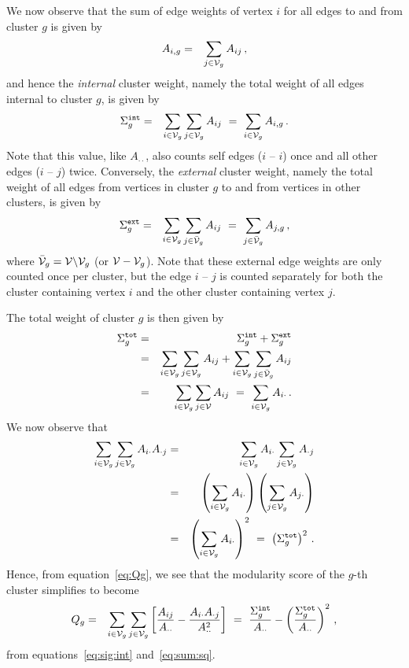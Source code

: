 \documentclass[a4paper]{article}
\begin{document}
We now observe that the sum of edge weights of vertex $i$ for all edges to and from cluster $g$
is given by
\begin{eqnarray}
  A_{i,g} & = & \sum_{j\in{\cal V}_g} A_{ij}\,,
\end{eqnarray}
and hence the {\em internal} cluster weight, namely the total weight of all edges internal to 
cluster $g$, is given by
\begin{eqnarray}
   \Sigma_g^{\tt int} & = & \sum_{i\in{\cal V}_g}\sum_{j\in{\cal V}_g} A_{ij}
   ~=~\sum_{i\in{\cal V}_g} A_{i,g}\,.
\label{eq:sig:int}
\end{eqnarray}
Note that this value, like $A_{\cdot\cdot}$, also counts self edges ($i$ -- $i$) once and all other edges 
($i$ -- $j$) twice.
Conversely, the {\em external} cluster weight, namely the total weight of all edges from vertices
in cluster $g$ to and from vertices in other clusters, is given by
\begin{eqnarray}
   \Sigma_g^{\tt ext} & = & \sum_{i\in{\cal V}_g}\sum_{j\in\bar{\cal V}_g}
   A_{ij} ~=~\sum_{j\in\bar{\cal V}_g} A_{j,g}\,,
\label{eq:sig:ext}
\end{eqnarray}
where $\bar{\cal V}_g={\cal V}\backslash{\cal V}_g$ (or ${\cal V}-{\cal V}_g$).
Note that these external edge weights are only counted once per cluster, but the
edge $i$ -- $j$ is counted separately for both the cluster containing vertex $i$
and the other cluster containing vertex $j$.

The total weight of cluster $g$ is then given by
\begin{eqnarray}
   \Sigma_g^{\tt tot} & = & \Sigma_g^{\tt int} + \Sigma_g^{\tt ext}
\nonumber\\&=&
   \sum_{i\in{\cal V}_g}\sum_{j\in{\cal V}_g} A_{ij} 
   + \sum_{i\in{\cal V}_g}\sum_{j\in\bar{\cal V}_g} A_{ij}
\nonumber\\&=&
   \sum_{i\in{\cal V}_g}\sum_{j\in{\cal V}} A_{ij}~=~\sum_{i\in{\cal V}_g}A_{i\cdot}\,.
\label{eq:sig:tot}
\end{eqnarray}
We now observe that
\begin{eqnarray}
    \sum_{i\in{\cal V}_g}\sum_{j\in{\cal V}_g} A_{i\cdot}A_{\cdot j}
    & = & \sum_{i\in{\cal V}_g}A_{i\cdot}\sum_{j\in{\cal V}_g} A_{\cdot j}
\nonumber\\&=&
    \left(\sum_{i\in{\cal V}_g}A_{i\cdot}\right)\left(\sum_{j\in{\cal V}_g} A_{j\cdot}\right)
\nonumber\\&=&
    \left(\sum_{i\in{\cal V}_g}A_{i\cdot}\right)^2 ~=~ \left(\Sigma_g^{\tt tot}\right)^2\,.
\label{eq:sum:sq}
\end{eqnarray}
Hence, from equation~\eqref{eq:Qg}, we see that the modularity score of the $g$-th cluster
simplifies to become
\begin{eqnarray}
   Q_g & = & \sum_{i\in{\cal V}_g}\sum_{j\in{\cal V}_g} \left[
  \frac{A_{ij}}{A_{\cdot\cdot}}-
  \frac{A_{i\cdot}A_{\cdot j}}{A_{\cdot\cdot}^2}
  \right]
~=~    \frac{\Sigma_g^{\tt int}}{A_{\cdot\cdot}}
    -\left(\frac{\Sigma_g^{\tt tot}}{A_{\cdot\cdot}}\right)^2\,,
\label{eq:Qg:only}
\end{eqnarray}
from equations~\eqref{eq:sig:int} and~\eqref{eq:sum:sq}.
\end{document}
